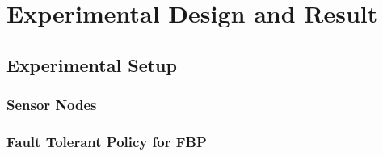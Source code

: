 \chapter{Experimental Design and Result}
\label{c:experiments}

\section{Experimental Setup}

\subsection{Sensor Nodes}

\subsection{Fault Tolerant Policy for FBP}

